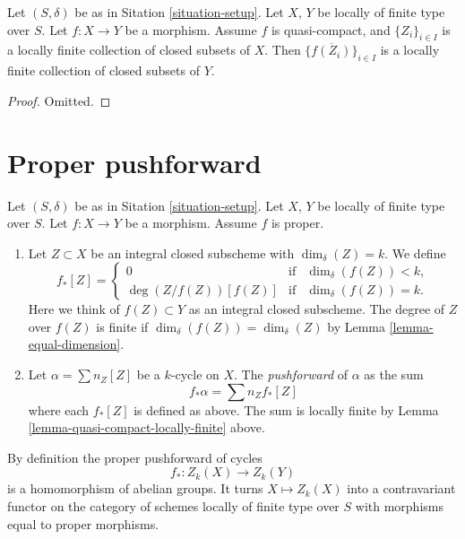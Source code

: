 \begin{lemma}
\label{lemma-quasi-compact-locally-finite}
Let $(S, \delta)$ be as in Sitation \ref{situation-setup}.
Let $X$, $Y$ be locally of finite type over $S$.
Let $f : X \to Y$ be a morphism.
Assume $f$ is quasi-compact, and $\{Z_i\}_{i \in I}$ is a locally
finite collection of closed subsets of $X$.
Then $\{\overline{f(Z_i)}\}_{i \in I}$ is a locally finite
collection of closed subsets of $Y$.
\end{lemma}

\begin{proof}
Omitted.
\end{proof}









\section{Proper pushforward}
\label{section-proper-pushforward}

\begin{definition}
\label{definition-proper-pushforward}
Let $(S, \delta)$ be as in Sitation \ref{situation-setup}.
Let $X$, $Y$ be locally of finite type over $S$.
Let $f : X \to Y$ be a morphism.
Assume $f$ is proper.
\begin{enumerate}
\item Let $Z \subset X$ be an integral closed subscheme
with $\dim_\delta(Z) = k$. We define
$$
f_*[Z] =
\left\{
\begin{matrix}
0 & \text{if} & \dim_\delta(f(Z))< k, \\
\deg(Z/f(Z)) [f(Z)] & \text{if} & \dim_\delta(f(Z)) = k.
\end{matrix}
\right.
$$
Here we think of $f(Z) \subset Y$ as an integral closed subscheme.
The degree of $Z$ over $f(Z)$ is finite if
$\dim_\delta(f(Z)) = \dim_\delta(Z)$
by Lemma \ref{lemma-equal-dimension}.
\item Let $\alpha = \sum n_Z [Z]$ be a $k$-cycle on $X$. The
{\it pushforward} of $\alpha$ as the sum
$$
f_* \alpha = \sum n_Z f_*[Z]
$$
where each $f_*[Z]$ is defined as above. The sum is locally finite
by Lemma \ref{lemma-quasi-compact-locally-finite} above.
\end{enumerate}
\end{definition}

\noindent
By definition the proper pushforward of cycles
$$
f_* : Z_k(X) \longrightarrow Z_k(Y)
$$
is a homomorphism of abelian groups. It turns $X \mapsto Z_k(X)$
into a contravariant functor on the category of schemes locally of
finite type over $S$ with morphisms equal to proper morphisms.

